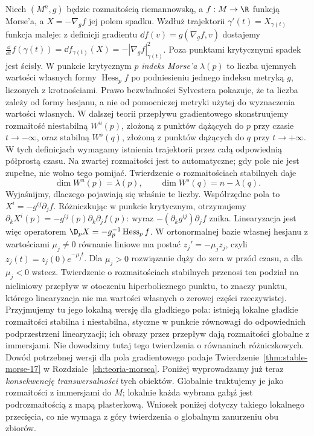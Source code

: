 Niech $(M^n,g)$ będzie rozmaitością riemannowską,
a $f:M\to\R$ funkcją Morse'a,
a $X=-\nabla_g f$ jej polem spadku.
Wzdłuż trajektorii $\gamma'(t)=X_{\gamma(t)}$ funkcja maleje:
z definicji gradientu $\dd f(v)=g(\nabla_g f,v)$ dostajemy
$\frac{\dd}{\dd t}f(\gamma(t))
=\dd f_{\gamma(t)}(X)=-|\nabla_g f|^2_{\gamma(t)}$.
Poza punktami krytycznymi spadek jest ścisły.
W punkcie
krytycznym $p$ \emph{indeks Morse'a}
$\lambda(p)$ to liczba ujemnych wartości
własnych formy $\operatorname{Hess}_p f$
po podniesieniu jednego indeksu metryką $g$,
liczonych z krotnościami. Prawo bezwładności Sylvestera
pokazuje, że ta liczba zależy od formy hesjanu,
a nie od pomocniczej metryki użytej do wyznaczenia
wartości własnych. W dalszej teorii
przepływu gradientowego skonstruujemy
rozmaitość niestabilną $W^u(p)$, złożoną
z punktów dążących do $p$ przy czasie
$t\to-\infty$, oraz stabilną $W^s(q)$,
złożoną z punktów dążących do $q$
przy $t\to+\infty$. W tych definicjach wymagamy
istnienia trajektorii przez całą odpowiednią półprostą
czasu. Na zwartej rozmaitości jest to automatyczne;
gdy pole nie jest zupełne, nie wolno tego pomijać.
Twierdzenie o
rozmaitościach stabilnych daje
\[
 \dim W^u(p)=\lambda(p),\qquad
 \dim W^s(q)=n-\lambda(q).
\]
Wyjaśnijmy, dlaczego pojawiają się właśnie te liczby.
Współrzędne pola to $X^i=-g^{ij}\partial_jf$.
Różniczkując w punkcie krytycznym, otrzymujemy
$\partial_kX^i(p)=-g^{ij}(p)\partial_k\partial_jf(p)$:
wyraz $-(\partial_kg^{ij})\partial_jf$ znika.
Linearyzacja jest więc operatorem
$\D_pX=-g_p^{-1}\operatorname{Hess}_pf$.
W ortonormalnej bazie własnej hesjanu z wartościami $\mu_j\ne0$
równanie liniowe ma postać $z_j'=-\mu_jz_j$,
czyli $z_j(t)=z_j(0)e^{-\mu_jt}$.
Dla $\mu_j>0$ rozwiązanie dąży do zera w przód czasu,
a dla $\mu_j<0$ wstecz.
Twierdzenie o rozmaitościach stabilnych przenosi ten podział
na nieliniowy przepływ w otoczeniu hiperbolicznego punktu,
to znaczy punktu, którego linearyzacja nie ma wartości
własnych o zerowej części rzeczywistej.
Przyjmujemy tu jego lokalną wersję dla gładkiego pola:
istnieją lokalne gładkie rozmaitości stabilna i niestabilna,
styczne w punkcie równowagi do odpowiednich podprzestrzeni
linearyzacji; ich obrazy przez przepływ dają rozmaitości
globalne z immersjami.
Nie dowodzimy tutaj tego twierdzenia o równaniach
różniczkowych. Dowód potrzebnej wersji dla pola gradientowego
podaje Twierdzenie~\ref{thm:stable-morse-17}
w Rozdziale~\ref{ch:teoria-morsea}.
Poniżej wyprowadzamy już teraz
\emph{konsekwencję transwersalności} tych obiektów.
Globalnie traktujemy je jako rozmaitości z immersjami
do $M$; lokalnie każda wybrana gałąź jest podrozmaitością
z mapą plasterkową. Wniosek poniżej dotyczy takiego
lokalnego przecięcia, co nie wymaga z góry twierdzenia
o globalnym zanurzeniu obu zbiorów.

